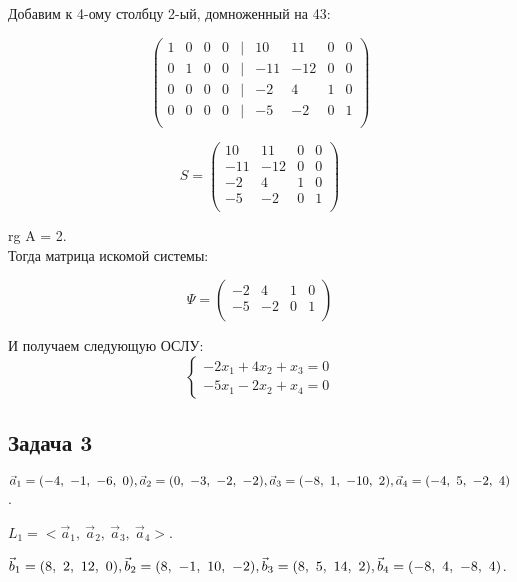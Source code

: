 	Добавим к 4-ому столбцу 2-ый, домноженный на 43:
	
	\[
	\begin{pmatrix}
	1 & 0 & 0 & 0 & | & 10 & 11 & 0 & 0 \\
	0 & 1 & 0 & 0 & | & -11 & -12 & 0 & 0 \\
	0 & 0 & 0 & 0 & | & -2 & 4 & 1 & 0 \\
	0 & 0 & 0 & 0 & | & -5 & -2 & 0 & 1 \\
	\end{pmatrix}
	\]
	
	\[ S=
	\begin{pmatrix}
	10 & 11 & 0 & 0 \\
	-11 & -12 & 0 & 0 \\
	-2 & 4 & 1 & 0 \\
	-5 & -2 & 0 & 1 \\
	\end{pmatrix}
	\]
	
	rg A = 2. \\
	
	Тогда матрица искомой системы:
	
	\[ \Psi=
	\begin{pmatrix}
	-2 & 4 & 1 & 0 \\
	-5 & -2 & 0 & 1 \\
	\end{pmatrix}
	\]
	
	 И получаем следующую ОСЛУ: 
	 \[
		 \begin{cases}
		 -2x_1 + 4x_2 + x_3 = 0 \\
		 -5x_1 -2x_2 + x_4 = 0
		 \end{cases}
	 \]
	
	
	
	\subsection{Задача 3} 
	$\vec a_1 = (-4,\ -1,\ -6,\ 0),\\ \vec a_2 = (0,\ -3,\ -2,\ -2),\\ 
	\vec a_3 = (-8,\ 1,\ -10,\ 2),\\ \vec a_4 = (-4,\ 5,\ -2,\ 4)$. 
	
	$L_1 = <\vec a_1,\ \vec a_2,\ \vec a_3,\ \vec a_4>$.
	
	$\vec b_1 = (8,\ 2,\ 12,\ 0),\\ \vec b_2 = (8,\ -1,\ 10,\ -2),\\ 
	\vec b_3 = (8,\ 5,\ 14,\ 2),\\ \vec b_4 = (-8,\ 4,\ -8,\ 4)$. 
	
